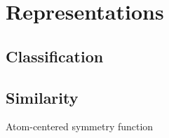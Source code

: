 
\section{Representations}
\subsection{Classification}
%
%
\subsection{Similarity}
%
%
%




% 
% 
\begin{frame}{Atom-centered symmetry function}
%
\end{frame}
%
%
%

